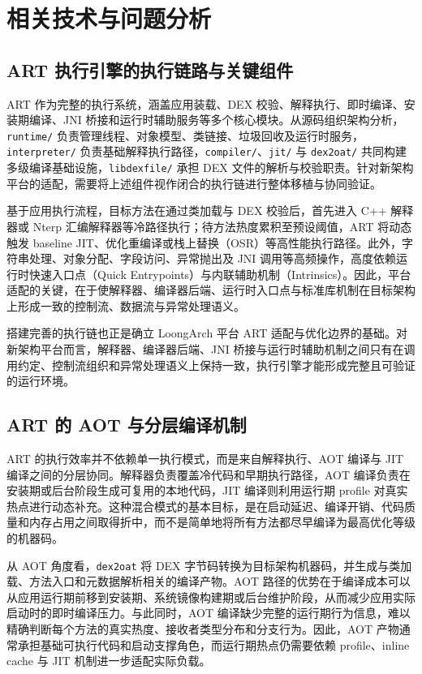 \chapter{相关技术与问题分析}\label{chap:related}

\section{ART 执行引擎的执行链路与关键组件}

ART 作为完整的执行系统，涵盖应用装载、DEX 校验、解释执行、即时编译、安装期编译、JNI 桥接和运行时辅助服务等多个核心模块\citep{AndroidRuntime2024, ArtJitCompiler2024}。从源码组织架构分析，\texttt{runtime/} 负责管理线程、对象模型、类链接、垃圾回收及运行时服务，\texttt{interpreter/} 负责基础解释执行路径，\texttt{compiler/}、\texttt{jit/} 与 \texttt{dex2oat/} 共同构建多级编译基础设施，\texttt{libdexfile/} 承担 DEX 文件的解析与校验职责。针对新架构平台的适配，需要将上述组件视作闭合的执行链进行整体移植与协同验证。

基于应用执行流程，目标方法在通过类加载与 DEX 校验后，首先进入 C++ 解释器或 Nterp 汇编解释器等冷路径执行；待方法热度累积至预设阈值，ART 将动态触发 baseline JIT、优化重编译或栈上替换（OSR）等高性能执行路径\citep{ArtJitCompiler2024, Fink2003, Lameed2013}。此外，字符串处理、对象分配、字段访问、异常抛出及 JNI 调用等高频操作，高度依赖运行时快速入口点（Quick Entrypoints）与内联辅助机制（Intrinsics）。因此，平台适配的关键，在于使解释器、编译器后端、运行时入口点与标准库机制在目标架构上形成一致的控制流、数据流与异常处理语义。

搭建完善的执行链也正是确立 LoongArch 平台 ART 适配与优化边界的基础。对新架构平台而言，解释器、编译器后端、JNI 桥接与运行时辅助机制之间只有在调用约定、控制流组织和异常处理语义上保持一致，执行引擎才能形成完整且可验证的运行环境。

\section{ART 的 AOT 与分层编译机制}

ART 的执行效率并不依赖单一执行模式，而是来自解释执行、AOT 编译与 JIT 编译之间的分层协同。解释器负责覆盖冷代码和早期执行路径，AOT 编译负责在安装期或后台阶段生成可复用的本地代码，JIT 编译则利用运行期 profile 对真实热点进行动态补充\citep{AndroidRuntime2024,ArtJitCompiler2024,Wang2011AOTAndroid}。这种混合模式的基本目标，是在启动延迟、编译开销、代码质量和内存占用之间取得折中，而不是简单地将所有方法都尽早编译为最高优化等级的机器码。

从 AOT 角度看，\texttt{dex2oat} 将 DEX 字节码转换为目标架构机器码，并生成与类加载、方法入口和元数据解析相关的编译产物。AOT 路径的优势在于编译成本可以从应用运行期前移到安装期、系统镜像构建期或后台维护阶段，从而减少应用实际启动时的即时编译压力。与此同时，AOT 编译缺少完整的运行期行为信息，难以精确判断每个方法的真实热度、接收者类型分布和分支行为。因此，AOT 产物通常承担基础可执行代码和启动支撑角色，而运行期热点仍需要依赖 profile、inline cache 与 JIT 机制进一步适配实际负载。

